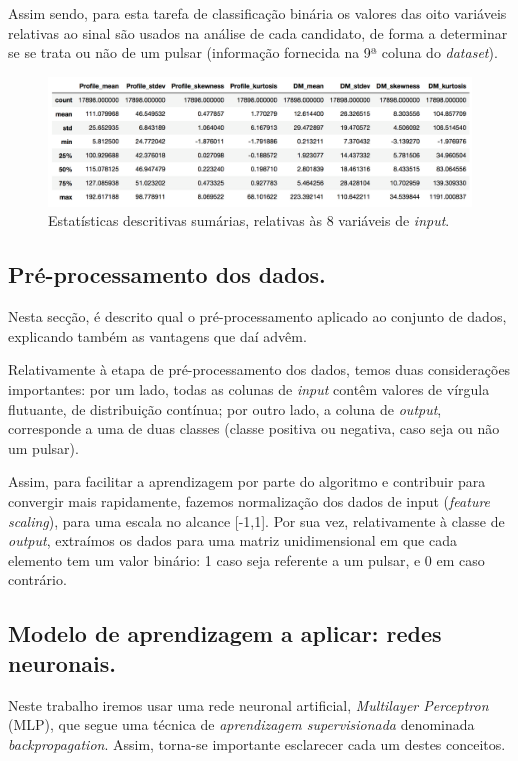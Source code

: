 \documentclass[]{article}
\begin{document}
    Assim sendo, para esta tarefa de classificação binária os valores das oito variáveis relativas ao sinal são usados na análise de cada candidato, de forma a determinar se se trata ou não de um pulsar (informação fornecida na 9ª coluna do \textit{dataset}).
    
    \begin{figure}[t]
	\centering
	\includegraphics[scale=0.24]{img/distTable.png}
    \caption{Estatísticas descritivas sumárias, relativas às 8 variáveis de \textit{input}.}
    \label{fig:descricao_do_dataset}
    \end{figure}


\subsection{Pré-processamento dos dados.}
\label{sec:preprocessamento}
	Nesta secção, é descrito qual o pré-processamento aplicado ao conjunto de dados, explicando também as vantagens que daí advêm.

	Relativamente à etapa de pré-processamento dos dados, temos duas considerações importantes: por um lado, todas as colunas de \textit{input} contêm valores de vírgula flutuante, de distribuição contínua; por outro lado, a coluna de \textit{output}, corresponde a uma de duas classes (classe positiva ou negativa, caso seja ou não um pulsar).
    
    Assim, para facilitar a aprendizagem por parte do algoritmo e contribuir para convergir mais rapidamente, fazemos normalização dos dados de input (\textit{feature scaling}), para uma escala no alcance [-1,1]. Por sua vez, relativamente à classe de \textit{output}, extraímos os dados para uma matriz unidimensional em que cada elemento tem um valor binário: 1 caso seja referente a um pulsar, e 0 em caso contrário.

\subsection{Modelo de aprendizagem a aplicar: redes neuronais.}
\label{sec:redes_neuronais}
	Neste trabalho iremos usar uma rede neuronal artificial, \textit{Multilayer Perceptron} (MLP), que segue uma técnica de \textit{aprendizagem supervisionada} denominada \textit{backpropagation}. Assim, torna-se importante esclarecer cada um destes conceitos.
\end{document}
